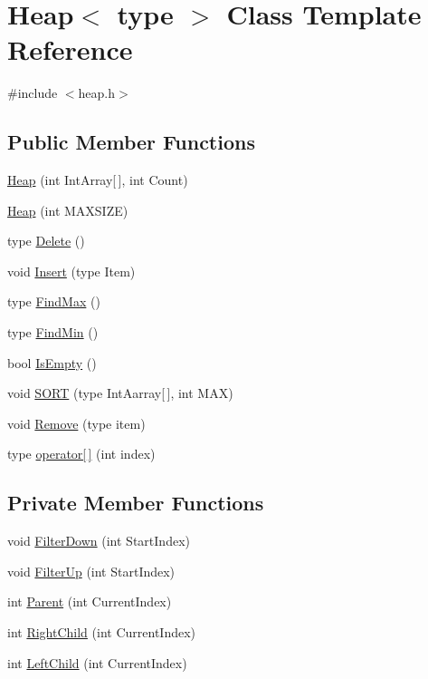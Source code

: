\hypertarget{classHeap}{
\section{Heap$<$ type $>$ Class Template Reference}
\label{classHeap}
}


{\ttfamily \#include $<$heap.h$>$}

\subsection*{Public Member Functions}
\begin{DoxyCompactItemize}
\item 
\hyperlink{classHeap_a033355743d1902b8e4cf6830cd8e3ddb}{Heap} (int IntArray\mbox{[}$\,$\mbox{]}, int Count)
\item 
\hyperlink{classHeap_a22b479991c536c7eb47a9bdf06d4dac6}{Heap} (int MAXSIZE)
\item 
type \hyperlink{classHeap_a2702a0d3142511c53b01c6d4a225e795}{Delete} ()
\item 
void \hyperlink{classHeap_aee71c9c62bfe019dba075fb766fbe66f}{Insert} (type Item)
\item 
type \hyperlink{classHeap_ad03a7a9eae5a24707e6190880123735e}{FindMax} ()
\item 
type \hyperlink{classHeap_a939367f091812b74651236c84b33cb4c}{FindMin} ()
\item 
bool \hyperlink{classHeap_ac9070548295b929b26eaae4f9f33feeb}{IsEmpty} ()
\item 
void \hyperlink{classHeap_ad7de4787b16904d60a0ee9093a13f44c}{SORT} (type IntAarray\mbox{[}$\,$\mbox{]}, int MAX)
\item 
void \hyperlink{classHeap_aae20fa71a0bd66d3c38530903d98d0c9}{Remove} (type item)
\item 
type \hyperlink{classHeap_a1da405a605c455cd721ac76906357e38}{operator\mbox{[}$\,$\mbox{]}} (int index)
\end{DoxyCompactItemize}
\subsection*{Private Member Functions}
\begin{DoxyCompactItemize}
\item 
void \hyperlink{classHeap_aa8f01571013d2d60f3b7358171c5e820}{FilterDown} (int StartIndex)
\item 
void \hyperlink{classHeap_a565386e79c3c6574dd82a7279755c3c1}{FilterUp} (int StartIndex)
\item 
int \hyperlink{classHeap_a2a963d8d9b9e8d8cc2ba9300e8a3ddbc}{Parent} (int CurrentIndex)
\item 
int \hyperlink{classHeap_a281ae8764bfc807afb0fe0989a1ac8d8}{RightChild} (int CurrentIndex)
\item 
int \hyperlink{classHeap_ab70ece2a97d7f2acae076eeab520bb4b}{LeftChild} (int CurrentIndex)
\end{DoxyCompactItemize}
